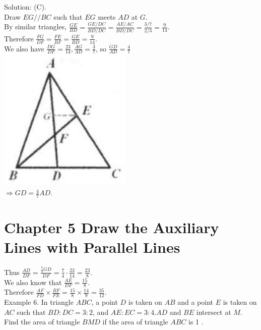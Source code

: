 \documentclass[10pt]{article}
\begin{document}
Solution: (C).\\
Draw \(E G / / B C\) such that \(E G\) meets \(A D\) at \(G\).\\
By similar triangles, \(\frac{G E}{B D}=\frac{G E / D C}{B D / D C}=\frac{A E / A C}{B D / D C}=\frac{3 / 7}{2 / 3}=\frac{9}{14}\).\\
Therefore \(\frac{F G}{D F}=\frac{F E}{B F}=\frac{G E}{B D}=\frac{9}{14}\).\\
We also have \(\frac{D G}{D F}=\frac{23}{14}, \frac{A G}{A D}=\frac{3}{7}\), so \(\frac{G D}{A D}=\frac{4}{7}\)\\
\includegraphics[max width=\textwidth, center]{2025_04_17_97bc1f7e44d93c271a88g-106(1)}\\
\(\Rightarrow G D=\frac{4}{7} A D\).

\section*{Chapter 5 Draw the Auxiliary Lines with Parallel Lines}
Thus \(\frac{A D}{D F}=\frac{\frac{7}{4} G D}{D F}=\frac{7}{4} \cdot \frac{23}{14}=\frac{23}{8}\).\\
We also know that \(\frac{A E}{D F}=\frac{15}{8}\).\\
Therefore \(\frac{A F}{F D} \times \frac{B F}{F E}=\frac{15}{8} \times \frac{14}{9}=\frac{35}{12}\).\\
Example 6. In triangle \(A B C\), a point \(D\) is taken on \(A B\) and a point \(E\) is taken on \(A C\) such that \(B D: D C=3: 2\), and \(A E: E C=3: 4 . A D\) and \(B E\) intersect at \(M\). Find the area of triangle \(B M D\) if the area of triangle \(A B C\) is 1 .
\end{document}
